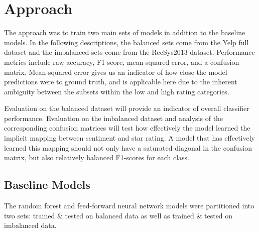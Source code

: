 \section{Approach}
The approach was to train two main sets of models in addition to the baseline models. In the following descriptions, the balanced sets come from the Yelp full dataset and the imbalanced sets come from the RecSys2013 dataset. Performance metrics include raw accuracy, F1-score, mean-squared error, and a confusion matrix. Mean-squared error gives us an indicator of how close the model predictions were to ground truth, and is applicable here due to the inherent ambiguity between the subsets within the low and high rating categories.
\par 
Evaluation on the balanced dataset will provide an indicator of overall classifier performance. Evaluation on the imbalanced dataset and analysis of the corresponding confusion matrices will test how effectively the model learned the implicit mapping between sentiment and star rating. A model that has effectively learned this mapping should not only have a saturated diagonal in the confusion matrix, but also relatively balanced F1-scores for each class.

\subsection{Baseline Models}
The random forest and feed-forward neural network models were partitioned into two sets: trained \& tested on balanced data as well as trained \& tested on imbalanced data.  


